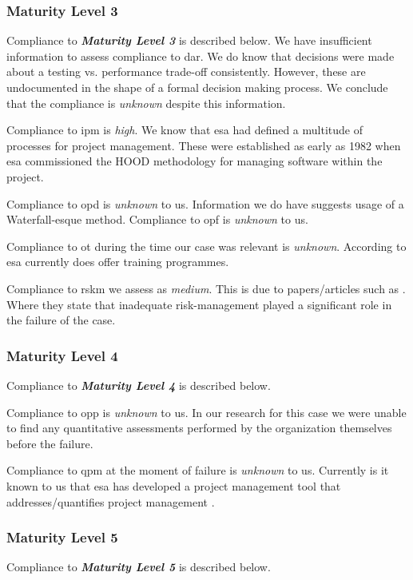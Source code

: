 \subsubsection{Maturity Level 3}
Compliance to \textbf{\textit{Maturity Level 3}} is described below.
We have insufficient information to assess compliance to \ac{dar}. We do know that decisions were made about a testing vs. performance trade-off consistently. However, these are undocumented in the shape of a formal decision making process. We conclude that the compliance is \textit{unknown} despite this information. 

Compliance to \ac{ipm} is \textit{high}. We know that \ac{esa} had defined a multitude of processes for project management. These were established as early as 1982 when \ac{esa} commissioned the HOOD methodology for managing software within the project. 

Compliance to \ac{opd} is \textit{unknown} to us. Information we do have suggests usage of a Waterfall-esque method. Compliance to \ac{opf} is \textit{unknown} to us. 

Compliance to \ac{ot} during the time our case was relevant is \textit{unknown}. According to \citep{esatraining2016} \ac{esa} currently does offer training programmes. 

Compliance to \ac{rskm} we assess as \textit{medium}. This is due to papers/articles such as \citep{nuseibeh1997ariane}. Where they state that inadequate risk-management played a significant role in the failure of the case.

\subsubsection{Maturity Level 4}
Compliance to \textbf{\textit{Maturity Level 4}} is described below. 

Compliance to \ac{opp} is \textit{unknown} to us. In our research for this case we were unable to find any quantitative assessments performed by the organization themselves before the failure. 

Compliance to \ac{qpm} at the moment of failure is \textit{unknown} to us. Currently is it known to us that \ac{esa} has developed a project management tool that addresses/quantifies project management \citep{esapmgmnt2016}.

\subsubsection{Maturity Level 5}
Compliance to \textbf{\textit{Maturity Level 5}} is described below. 

